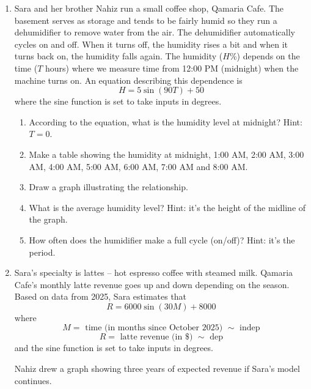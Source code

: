 \begin{enumerate}

\item %
Sara and her brother Nahiz run a small coffee shop, Qamaria Cafe.  The basement serves as storage and tends to be fairly humid so they run a dehumidifier to remove water from the air. The dehumidifier automatically cycles on and off.  When it turns off, the humidity rises a bit and when it turns back on, the humidity falls again.  The humidity ($H$\%) depends on the time ($T$ hours) where we measure time from 12:00 PM (midnight) when the machine turns on.  An equation describing this dependence is 
$$H = 5\sin(90T)+50$$
where the sine function is set to take inputs in degrees.
\begin{enumerate}
    \item According to the equation, what is the humidity level at midnight? Hint: $T=0$.
    \item Make a table showing the humidity at midnight, 1:00 AM, 2:00 AM, 3:00 AM, 4:00 AM, 5:00 AM, 6:00 AM, 7:00 AM and 8:00 AM.
    \item Draw a graph illustrating the relationship.
    \item What is the average humidity level? Hint: it's the height of the midline of the graph.
    \item How often does the humidifier make a full cycle (on/off)?  Hint: it's the period.
\end{enumerate}

\item %

Sara's specialty is lattes -- hot espresso coffee with steamed milk. Qamaria Cafe's monthly latte revenue goes up and down depending on the season.  Based on data from 2025, Sara estimates that 
$$R=6000\sin(30M)+8000$$
where
$$M = \text{ time (in months since October 2025) } \sim \text{ indep}$$
$$R = \text{ latte revenue (in \$) } \sim \text{ dep}$$
and the sine function is set to take inputs in degrees.

Nahiz drew a graph showing three years of expected revenue if Sara's model continues.

\begin{center}
\end{center}
\end{enumerate}
